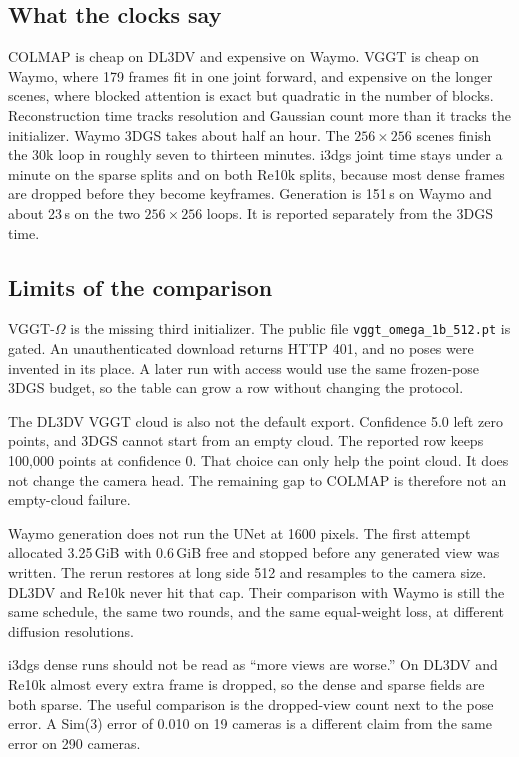 \documentclass[10pt,twocolumn,letterpaper]{article}
\begin{document}
\subsection{What the clocks say}
COLMAP is cheap on DL3DV and expensive on Waymo.
VGGT is cheap on Waymo, where 179 frames fit in one joint forward, and expensive on the longer scenes, where blocked attention is exact but quadratic in the number of blocks.
Reconstruction time tracks resolution and Gaussian count more than it tracks the initializer.
Waymo 3DGS takes about half an hour.
The $256\times256$ scenes finish the 30k loop in roughly seven to thirteen minutes.
i3dgs joint time stays under a minute on the sparse splits and on both Re10k splits, because most dense frames are dropped before they become keyframes.
Generation is 151\,s on Waymo and about 23\,s on the two $256\times256$ loops.
It is reported separately from the 3DGS time.

\subsection{Limits of the comparison}
VGGT-$\Omega$ is the missing third initializer.
The public file \texttt{vggt\_omega\_1b\_512.pt} is gated.
An unauthenticated download returns HTTP 401, and no poses were invented in its place.
A later run with access would use the same frozen-pose 3DGS budget, so the table can grow a row without changing the protocol.

The DL3DV VGGT cloud is also not the default export.
Confidence 5.0 left zero points, and 3DGS cannot start from an empty cloud.
The reported row keeps 100{,}000 points at confidence 0.
That choice can only help the point cloud.
It does not change the camera head.
The remaining gap to COLMAP is therefore not an empty-cloud failure.

Waymo generation does not run the UNet at 1600 pixels.
The first attempt allocated 3.25\,GiB with 0.6\,GiB free and stopped before any generated view was written.
The rerun restores at long side 512 and resamples to the camera size.
DL3DV and Re10k never hit that cap.
Their comparison with Waymo is still the same schedule, the same two rounds, and the same equal-weight loss, at different diffusion resolutions.

i3dgs dense runs should not be read as ``more views are worse.''
On DL3DV and Re10k almost every extra frame is dropped, so the dense and sparse fields are both sparse.
The useful comparison is the dropped-view count next to the pose error.
A Sim(3) error of 0.010 on 19 cameras is a different claim from the same error on 290 cameras.
\end{document}

